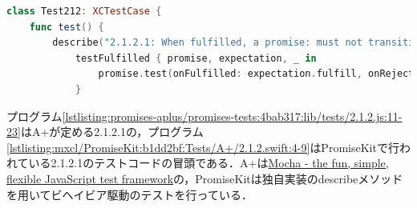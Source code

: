 \begin{lstlisting}[language=swift,caption=\href{https://github.com/mxcl/PromiseKit/blob/b1dd2bf874002e7fa142cd0a1356528e204f5779/Tests/A+/2.1.2.swift}{PromiseKitにおけるテスト2.1.2.1},label=lstlisting:mxcl/PromiseKit:b1dd2bf:Tests/A+/2.1.2.swift:4-9,firstnumber=4]
class Test212: XCTestCase {
    func test() {
        describe("2.1.2.1: When fulfilled, a promise: must not transition to any other state.") {
            testFulfilled { promise, expectation, _ in
                promise.test(onFulfilled: expectation.fulfill, onRejected: { XCTFail() })
            }
\end{lstlisting}

プログラム\ref{lstlisting:promises-aplus/promises-tests:4bab317:lib/tests/2.1.2.js:11-23}はA+が定める2.1.2.1の，プログラム\ref{lstlisting:mxcl/PromiseKit:b1dd2bf:Tests/A+/2.1.2.swift:4-9}はPromiseKitで行われている2.1.2.1のテストコードの冒頭である．A+は\href{https://mochajs.org/}{Mocha - the fun, simple, flexible JavaScript test framework}の，PromiseKitは独自実装の{\sf describe}メソッドを用いてビヘイビア駆動のテストを行っている．
